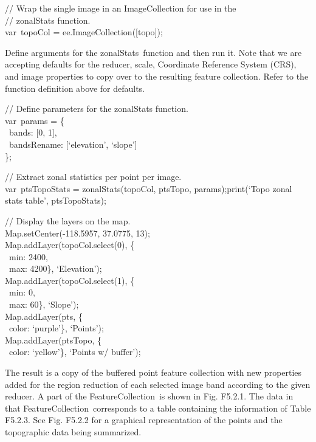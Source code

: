 \documentclass[
  letterpaper,
  DIV=11,
  numbers=noendperiod]{scrreprt}
\begin{document}
// Wrap the single image in an ImageCollection for use in the\\
// zonalStats function.\\
var~topoCol = ee.ImageCollection({[}topo{]});

Define arguments for the zonalStats~function and then run it. Note that
we are accepting defaults for the reducer, scale, Coordinate Reference
System (CRS), and image properties to copy over to the resulting feature
collection. Refer to the function definition above for defaults.

// Define parameters for the zonalStats function.\\
var~params = \{\\
\hspace*{0.333em} ~bands: {[}0, 1{]},\\
\hspace*{0.333em} ~bandsRename: {[}`elevation', `slope'{]}\\
\};

// Extract zonal statistics per point per image.\\
var~ptsTopoStats = zonalStats(topoCol, ptsTopo, params);print(`Topo
zonal stats table', ptsTopoStats);

// Display the layers on the map.\\
Map.setCenter(-118.5957, 37.0775, 13);\\
Map.addLayer(topoCol.select(0), \{\\
\hspace*{0.333em} ~min: 2400,\\
\hspace*{0.333em} ~max: 4200\}, `Elevation');\\
Map.addLayer(topoCol.select(1), \{\\
\hspace*{0.333em} ~min: 0,\\
\hspace*{0.333em} ~max: 60\}, `Slope');\\
Map.addLayer(pts, \{\\
\hspace*{0.333em} ~color: `purple'\}, `Points');\\
Map.addLayer(ptsTopo, \{\\
\hspace*{0.333em} ~color: `yellow'\}, `Points w/ buffer');

The result is a copy of the buffered point feature collection with new
properties added for the region reduction of each selected image band
according to the given reducer. A part of the FeatureCollection~is shown
in Fig. F5.2.1. The data in that FeatureCollection~corresponds to a
table containing the information of Table F5.2.3. See Fig. F5.2.2 for a
graphical representation of the points and the topographic data being
summarized.
\end{document}
